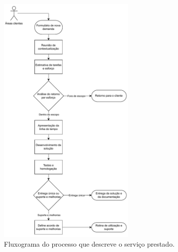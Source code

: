 	\begin{figure}[!tb]
		\centering
		\includegraphics[width=0.6\textwidth]{./figuras/processFlow.pdf}
		\caption{Fluxograma do processo que descreve o serviço prestado.}
		\label{fig:metodologia:processFlow}
	\end{figure}
	
